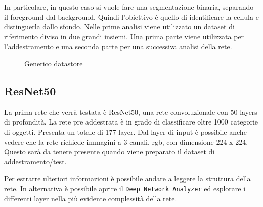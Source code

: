 \documentclass{ieeeojies}
\begin{document}
In particolare, in questo caso si vuole fare una segmentazione binaria, separando il foreground dal background. Quindi l’obiettivo è quello di identificare la cellula e distinguerla dallo sfondo. Nelle prime analisi viene utilizzato un dataset di riferimento diviso in due grandi insiemi. Una prima parte viene utilizzata per l’addestramento e una seconda parte per una successiva analisi della rete.

\begin{figure}
	\tiny{\def\svgwidth{\linewidth}
	}
\caption{Generico datastore}
\end{figure}

\subsection{ResNet50}

La prima rete che verrà testata è ResNet50, una rete convoluzionale con 50 layers di profondità. La rete pre addestrata è in grado di classificare oltre 1000 categorie di oggetti. Presenta un totale di 177 layer. Dal layer di input è possibile anche vedere che la rete richiede immagini a 3 canali, rgb, con dimensione 224 x 224. Questo sarà da tenere presente quando viene preparato il dataset di addestramento/test. 

Per estrarre ulteriori informazioni è possibile andare a leggere la struttura della rete. In alternativa è possibile aprire il \texttt{Deep Network Analyzer} ed esplorare i differenti layer nella più evidente complessità della rete.









\EOD
\end{document}
